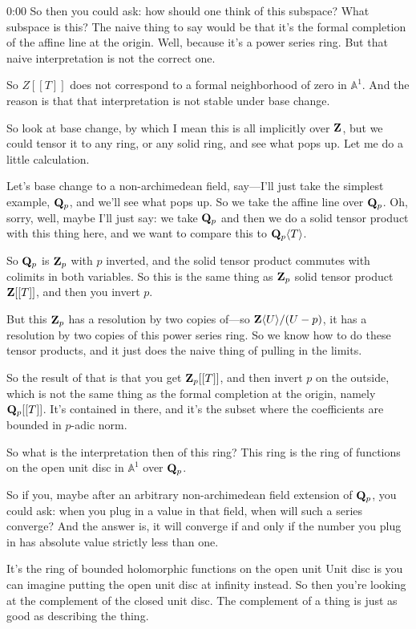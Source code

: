 \begin{unfinished}{0:00}
So then you could ask: how should one think of this subspace? What subspace is this? The naive thing to say would be that it's the formal completion of the affine line at the origin. Well, because it's a power series ring. But that naive interpretation is not the correct one.

So $Z[[T]]$ does not correspond to a formal neighborhood of zero in $\mathbb{A}^1$. And the reason is that that interpretation is not stable under base change.

So look at base change, by which I mean this is all implicitly over $\mathbf Z$, but we could tensor it to any ring, or any solid ring, and see what pops up. Let me do a little calculation.

Let's base change to a non-archimedean field, say---I'll just take the simplest example, $\mathbf Q_p$, and we'll see what pops up. So we take the affine line over $\mathbf Q_p$. Oh, sorry, well, maybe I'll just say: we take $\mathbf Q_p$ and then we do a solid tensor product with this thing here, and we want to compare this to $\mathbf Q_p\langle T\rangle$.

So $\mathbf Q_p$ is $\mathbf Z_p$ with $p$ inverted, and the solid tensor product commutes with colimits in both variables. So this is the same thing as $\mathbf Z_p$ solid tensor product $\mathbf Z[[T]]$, and then you invert $p$.

But this $\mathbf Z_p$ has a resolution by two copies of---so $\mathbf Z\langle U\rangle/(U-p)$, it has a resolution by two copies of this power series ring. So we know how to do these tensor products, and it just does the naive thing of pulling in the limits.

So the result of that is that you get $\mathbf Z_p[[T]]$, and then invert $p$ on the outside, which is not the same thing as the formal completion at the origin, namely $\mathbf Q_p[[T]]$. It's contained in there, and it's the subset where the coefficients are bounded in $p$-adic norm.

So what is the interpretation then of this ring? This ring is the ring of functions on the open unit disc in $\mathbb{A}^1$ over $\mathbf Q_p$.

So if you, maybe after an arbitrary non-archimedean field extension of $\mathbf Q_p$, you could ask: when you plug in a value in that field, when will such a series converge? And the answer is, it will converge if and only if the number you plug in has absolute value strictly less than one. 

It's the ring of bounded holomorphic functions on the open unit
Unit disc is you can imagine putting the open unit disc at infinity instead. So then you're looking at the complement of the closed unit disc. The complement of a thing is just as good as describing the thing.


\end{unfinished}
